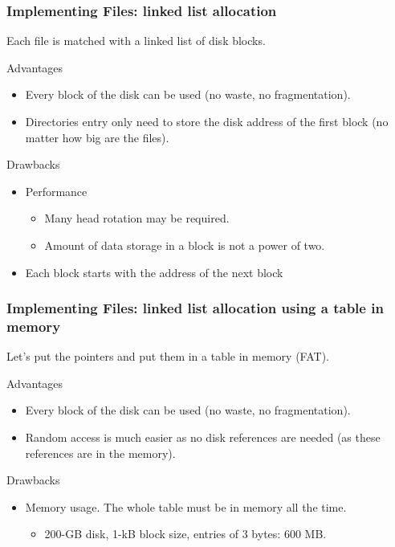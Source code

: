 \begin{frame}
    \frametitle{Implementing Files: linked list allocation}
    Each file is matched with a linked list of disk blocks.
    \begin{block}{Advantages}
        \begin{itemize}
            \item Every block of the disk can be used (no waste, no fragmentation).
            \item Directories entry only need to store the disk address of the first block (no matter how big are the files).
        \end{itemize}
    \end{block}
    \begin{block}{Drawbacks}
        \begin{itemize}
            \item Performance
                \begin{itemize}
                    \item Many head rotation may be required.
                    \item Amount of data storage in a block is not a power of two.%
                \end{itemize}
            \item Each block starts with the address of the next block%
        \end{itemize}
    \end{block}
\end{frame}

\begin{frame}
    \frametitle{Implementing Files: linked list allocation using a table in memory}
    Let's put the pointers and put them in a table in memory (FAT).
    \begin{block}{Advantages}
        \begin{itemize}
            \item Every block of the disk can be used (no waste, no fragmentation).
            \item Random access is much easier as no disk references are needed (as these references are in the memory).
        \end{itemize}
    \end{block}
    \begin{block}{Drawbacks}
        \begin{itemize}
            \item Memory usage. The whole table must be in memory all the time.
                \begin{itemize}
                    \item 200-GB disk, 1-kB block size, entries of 3 bytes: 600 MB.
                \end{itemize}
        \end{itemize}
    \end{block}
\end{frame}

